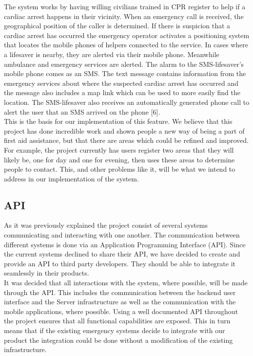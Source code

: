 \documentclass[]{article}
\begin{document}
The system works by having willing civilians trained in CPR register to help if a cardiac arrest happens in their vicinity. When an emergency call is received, the geographical position of the caller is determined. If there is suspicion that a cardiac arrest has occurred the emergency operator activates a positioning system that locates the mobile phones of helpers connected to the service. In cases where a lifesaver is nearby, they are alerted via their mobile phone. Meanwhile ambulance and emergency services are alerted. The alarm to the SMS-lifesaver’s mobile phone comes as an SMS. The text message contains information from the emergency services about where the suspected cardiac arrest has occurred and the message also includes a map link which can be used to more easily find the location. The SMS-lifesaver also receives an automatically generated phone call to alert the user that an SMS arrived on the phone [6].\\

This is the basis for our implementation of this feature. We believe that this project has done incredible work and shown people a new way of being a part of first aid assistance, but that there are areas which could be refined and improved. For example, the project currently has users register two areas that they will likely be, one for day and one for evening, then uses these areas to determine people to contact. This, and other problems like it, will be what we intend to address in our implementation of the system.\\

\pagebreak
    \subsection{API}
    As it was previously explained the project consist of several systems communicating and interacting with one another. The communication between different systems is done via an Application Programming Interface (API). Since the current systems declined to share their API, we have decided to create and provide an API to third party developers. They should be able to integrate it seamlessly in their products.\\

It was decided that all interactions with the system, where possible, will be made through the API. This includes the communication between the backend user interface and the Server infrastructure as well as the communication with the mobile applications, where possible. Using a well documented API throughout the project ensures that all functional capabilities are exposed. This in turn means that if the existing emergency systems decide to integrate with our product the integration could be done without a modification of the existing infrastructure.\\
\end{document}
